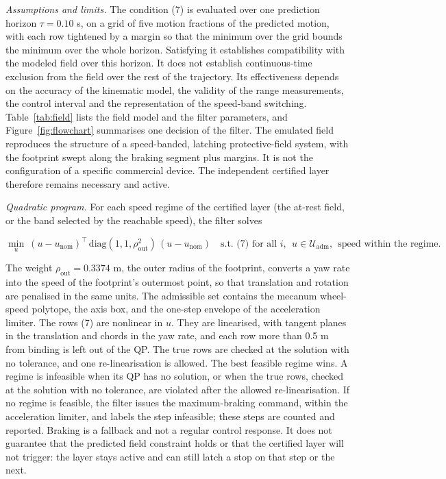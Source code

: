 \emph{Assumptions and limits.} The condition (7) is evaluated over one prediction horizon $\tau = 0.10$ s, on a grid of five motion fractions of the predicted motion, with each row tightened by a margin so that the minimum over the grid bounds the minimum over the whole horizon. Satisfying it establishes compatibility with the modeled field over this horizon. It does not establish continuous-time exclusion from the field over the rest of the trajectory. Its effectiveness depends on the accuracy of the kinematic model, the validity of the range measurements, the control interval and the representation of the speed-band switching. Table~\ref{tab:field} lists the field model and the filter parameters, and Figure~\ref{fig:flowchart} summarises one decision of the filter. The emulated field reproduces the structure of a speed-banded, latching protective-field system, with the footprint swept along the braking segment plus margins. It is not the configuration of a specific commercial device. The independent certified layer therefore remains necessary and active.

\emph{Quadratic program.} For each speed regime of the certified layer (the at-rest field, or the band selected by the reachable speed), the filter solves

\begin{equation*}
\min_{u}\ (u - u_{\mathrm{nom}})^{\top}\, \mathrm{diag}(1, 1, \rho_{\mathrm{out}}^{2})\,(u - u_{\mathrm{nom}})
\quad \text{s.t. (7) for all } i,\ \ u \in \mathcal{U}_{\mathrm{adm}},\ \ \text{speed within the regime}.
\tag{8}
\end{equation*}

The weight $\rho_{\mathrm{out}} = 0.3374$ m, the outer radius of the footprint, converts a yaw rate into the speed of the footprint's outermost point, so that translation and rotation are penalised in the same units. The admissible set contains the mecanum wheel-speed polytope, the axis box, and the one-step envelope of the acceleration limiter. The rows (7) are nonlinear in $u$. They are linearised, with tangent planes in the translation and chords in the yaw rate, and each row more than 0.5 m from binding is left out of the QP. The true rows are checked at the solution with no tolerance, and one re-linearisation is allowed. The best feasible regime wins. A regime is infeasible when its QP has no solution, or when the true rows, checked at the solution with no tolerance, are violated after the allowed re-linearisation. If no regime is feasible, the filter issues the maximum-braking command, within the acceleration limiter, and labels the step infeasible; these steps are counted and reported. Braking is a fallback and not a regular control response. It does not guarantee that the predicted field constraint holds or that the certified layer will not trigger: the layer stays active and can still latch a stop on that step or the next.

